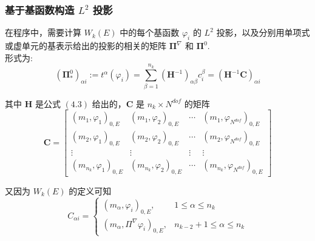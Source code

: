 \subsubsection{基于基函数构造 $L^2$ 投影}

在程序中，需要计算 $W_k(E)$ 中的每个基函数 $\varphi_i$ 的 $L^2$ 投影，以及分别用单项式或虚单元的基表示给出的投影的相关的矩阵 $\boldsymbol\Pi^\nabla$ 和 $\boldsymbol\Pi^0$. \\

形式为: \\
\begin{equation}
(\boldsymbol{\Pi}_{*}^0)_{\alpha i} := t^{\alpha}(\varphi_i) = \sum_{\beta = 1}^{n_k}(\mathbf{H}^{-1})_{\alpha\beta}c_{i}^{\beta} = (\mathbf{H}^{-1}\mathbf{C})_{\alpha i}
\end{equation}

其中 $\mathbf H$ 是公式 $(4.3)$ 给出的，$\mathbf C$ 是 $n_k \times N^{dof}$ 的矩阵 \\
\begin{equation*}
\mathbf C = \begin{bmatrix}
(m_1, \varphi_1)_{0,E} & (m_1, \varphi_2)_{0,E} & \cdots & (m_1, \varphi_{N^{dof}})_{0,E} \\
(m_2, \varphi_1)_{0,E} & (m_2, \varphi_2)_{0,E} & \cdots & (m_2, \varphi_{N^{dof}})_{0,E}\\
\vdots & \vdots & \vdots & \vdots \\
(m_{n_k}, \varphi_1)_{0,E} & (m_{n_k}, \varphi_2)_{0,E} & \cdots & (m_{n_k}, \varphi_{N^{dof}})_{0,E}
\end{bmatrix}
\end{equation*}

又因为 $W_k(E)$ 的定义可知 \\
\begin{equation}
C_{\alpha i} = 
\begin{cases}
(m_{\alpha},\varphi_i)_{0,E}, & 1 \le \alpha \le n_k\\
(m_{\alpha},\Pi^{\nabla}\varphi_i)_{0,E}, & n_{k-2} + 1\le \alpha \le n_k
\end{cases}
\end{equation}

